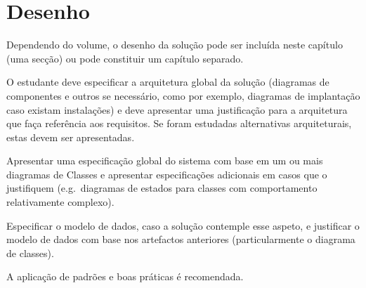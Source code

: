 \section{Desenho} %
\label{sec:design}

Dependendo do volume, o desenho da solução pode ser incluída neste capítulo (uma secção) ou pode constituir um capítulo separado.

O estudante deve especificar a arquitetura global da solução (diagramas de componentes e outros se necessário, como por exemplo, diagramas de implantação caso existam instalações) e deve apresentar uma justificação para a arquitetura que faça referência aos requisitos. Se foram estudadas alternativas arquiteturais, estas devem ser apresentadas.

Apresentar uma especificação global do sistema com base em um ou mais diagramas de Classes e apresentar especificações adicionais em casos que o justifiquem (e.g.\ diagramas de estados para classes com comportamento relativamente complexo).

Especificar o modelo de dados, caso a solução contemple esse aspeto, e justificar o modelo de dados com base nos artefactos anteriores (particularmente o diagrama de classes).

A aplicação de padrões e boas práticas é recomendada.


